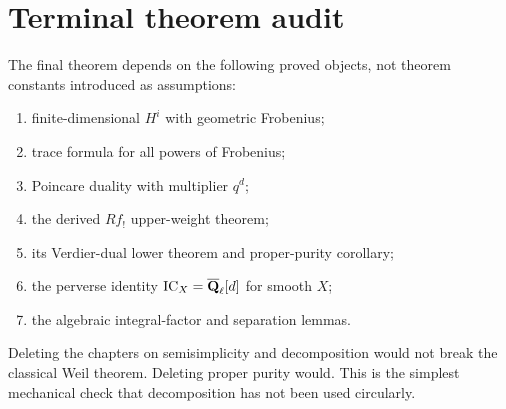 \section{Terminal theorem audit}

The final theorem depends on the following proved objects, not theorem
constants introduced as assumptions:

\begin{enumerate}
\item finite-dimensional \(H^i\) with geometric Frobenius;
\item trace formula for all powers of Frobenius;
\item Poincare duality with multiplier \(q^d\);
\item the derived \(Rf_!\) upper-weight theorem;
\item its Verdier-dual lower theorem and proper-purity corollary;
\item the perverse identity \(\operatorname{IC}_X=\overline{\mathbf Q}_\ell[d]\) for smooth \(X\);
\item the algebraic integral-factor and separation lemmas.
\end{enumerate}

Deleting the chapters on semisimplicity and decomposition would not break the
classical Weil theorem.  Deleting proper purity would.  This is the simplest
mechanical check that decomposition has not been used circularly.
